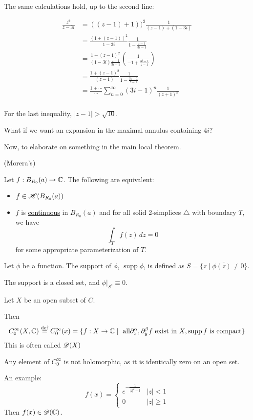 \documentclass[x11names,reqno,14pt]{extarticle}
\newcommand{\oo}{{\infty}}
\begin{document}
The same calculations hold, up to the second line: 

\begin{align*}
\frac{z^2}{z - 3i} & = ((z - 1) + 1))^2\frac{1}{(z - 1) + (1 - 3i)} \\
						  & = \frac{(1 + (z - 1))^2}{1 - 3i}\frac{1}{1 - \frac{z - 1}{3i - 1}} \\
						  & = \frac{1 + (z - 1)^2}{(1 - 3i)\frac{z - 1}{3i - 1}}\left(\frac{1}{-1 + \frac{3i - 1}{z - 1}}\right) \\
						  & = \frac{1 + (z - 1)^2}{(z - 1)}\frac{1}{1 - \frac{3i - 1}{z - 1}} \\
							& = \frac{1 + \cdots}{\cdots}\sum_{n=0}^\oo (3i - 1)^n\frac{1}{(z + 1)^n} \\
\end{align*}

For the last inequality, $|z - 1| > \sqrt{10}$. 

What if we want an expansion in the maximal annulus containing $4i$?

Now, to elaborate on something in the main local theorem. 

\thm (Morera's)

Let $f:B_{R_0}(a) \to \mathbb{C}$. The following are equivalent:
\begin{itemize}
\item $f \in \mathscr{H}(B_{R_0}(a))$
\item $f$ is \underline{continuous} in $B_{R_0}(a)$ and for all solid 2-simplices $\bigtriangleup$ with boundary $T$, we have
\[
\int_Tf(z)\,dz = 0
\]
for some appropriate parameterization of $T$. 
\end{itemize}


Let $\phi$ be a function. The \underline{support} of $\phi$, $\operatorname{supp} \phi$, is defined as $S = \bar{\{z\mid\phi(z)\neq 0\}}$. 

\rem The support is a closed set, and $\phi|_{S^c} \equiv 0$. 


Let $X$ be an open subset of $C$. 

Then 
\[
C_0^\oo(X, \C)\eqdef C_0^\oo(x) = \{f:X\to \C \mid \text{ all}\del_x^\alpha,\del_y^\beta f\text{ exist in }X,\operatorname{supp}f \text{ is compact}\}
\]
This is often called $\mathscr{D}(X)$

Any element of $C_0^\oo$ is not holomorphic, as it is identically zero on an open set. 

An example: 
\[
f(x) = \begin{cases} e^{-\frac{1}{|z|^2 - 1}} & |z| < 1 \\ 0 & |z| \geq 1 \end{cases} 
\]
Then $f(x) \in \mathscr{D}(\mathbb{C})$. 
\end{document}
